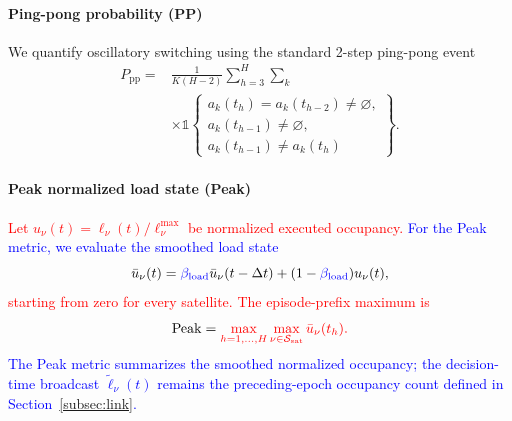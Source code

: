 \documentclass[10pt,letterpaper,journal]{IEEEtran}
\newcommand{\mathbbm}[1]{\mathds{#1}}
\newcommand{\revnew}[1]{\textcolor{red}{#1}}
\begin{document}
\paragraph{Ping-pong probability (PP)}
We quantify oscillatory switching using the standard 2-step ping-pong event
\begingroup
\color{blue}
\begin{equation}
\begin{aligned}
P_{\mathrm{pp}}
={}&\frac{1}{K(H-2)}
\sum_{h=3}^{H}\sum_k\\
&\times\mathbbm{1}\!\left\{
\begin{array}{l}
a_k(t_h)=a_k(t_{h-2})\neq\varnothing,\\
a_k(t_{h-1})\neq\varnothing,\\
a_k(t_{h-1})\neq a_k(t_h)
\end{array}
\right\}.
\end{aligned}
\label{eq:metric_pp}
\end{equation}
\endgroup

\paragraph{Peak normalized load state (Peak)}

\revnew{Let $u_\nu(t)=\ell_\nu(t)/\ell_\nu^{\max}$ be normalized executed occupancy.}
\textcolor{blue}{For the Peak metric, we evaluate the smoothed load state}
\begin{equation}
\bar u_\nu(t)
=
\textcolor{blue}{\beta_{\rm load}}\bar u_\nu(t-\Delta t)
+
(1-\textcolor{blue}{\beta_{\rm load}})u_\nu(t),
\end{equation}
\revnew{starting from zero for every satellite. The episode-prefix maximum is}
\begin{equation}
 \mathrm{Peak}
=
\revnew{\max_{h=1,\ldots,H}\max_{\nu\in\mathcal S_{\rm sat}}
\bar u_\nu(t_h).}   
\end{equation}
\textcolor{blue}{The Peak metric summarizes the smoothed normalized occupancy; the decision-time broadcast $\tilde\ell_\nu(t)$ remains the preceding-epoch occupancy count defined in Section~\ref{subsec:link}.} 

\end{document}
